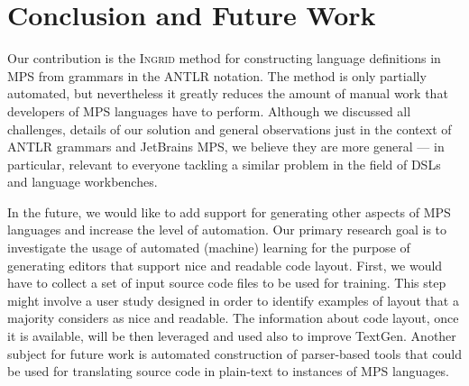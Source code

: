 \section{Conclusion and Future Work}

Our contribution is the \textsc{Ingrid} method for constructing language definitions in MPS from grammars in the ANTLR notation.
The method is only partially automated, but nevertheless it greatly reduces the amount of manual work that developers of MPS languages have to perform.
Although we discussed all challenges, details of our solution and general observations just in the context of ANTLR grammars and JetBrains MPS, we believe they are more general --- in particular, relevant to everyone tackling a similar problem in the field of DSLs and language workbenches.

In the future, we would like to add support for generating other aspects of MPS languages and increase the level of automation.
Our primary research goal is to investigate the usage of automated (machine) learning for the purpose of generating editors that support nice and readable code layout.
First, we would have to collect a set of input source code files to be used for training. This step might involve a user study designed in order to identify examples of layout that a majority considers as nice and readable.
The information about code layout, once it is available, will be then leveraged and used also to improve TextGen.
Another subject for future work is automated construction of parser-based tools that could be used for translating source code in plain-text to instances of MPS languages.

